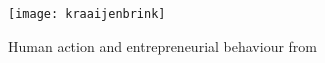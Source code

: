 \begin{figure}[!htb]
	\centering
	\texttt{[image: kraaijenbrink]}
	\caption{Human action and entrepreneurial behaviour from \citet{doi:10.1108/S1876-0228(2012)0000009015}}
	\label{fig:kraaijenbrink}
\end{figure}

%

 